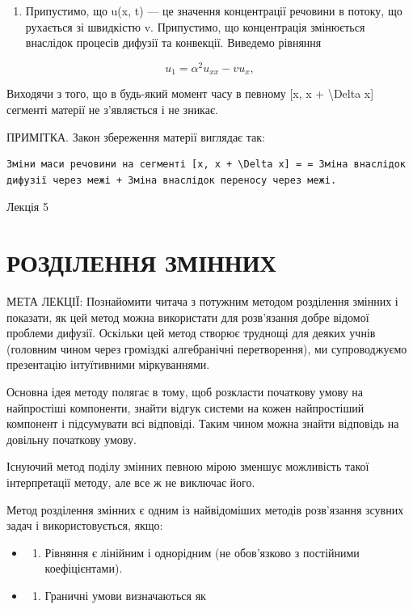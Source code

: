 \documentclass[
]{article}
\providecommand{\tightlist}{%
  \setlength{\itemsep}{0pt}\setlength{\parskip}{0pt}}
\begin{document}
\begin{enumerate}
\def\labelenumi{\arabic{enumi}.}
\setcounter{enumi}{3}
\tightlist
\item
  Припустимо, що u(x, t) --- це значення концентрації речовини в потоку,
  що рухається зі швидкістю v. Припустимо, що концентрація змінюється
  внаслідок процесів дифузії та конвекції. Виведемо рівняння
\end{enumerate}

\[
u_1 = \alpha^2 u_{xx} - v u_x,
\]

Виходячи з того, що в будь-який момент часу в певному {[}x, x +
\textbackslash Delta x{]} сегменті матерії не з'являється і не зникає.

ПРИМІТКА. Закон збереження матерії виглядає так:

\begin{verbatim}
Зміни маси речовини на сегменті [x, x + \Delta x] = = Зміна внаслідок дифузії через межі + Зміна внаслідок переносу через межі.
\end{verbatim}

Лекція 5

\section{РОЗДІЛЕННЯ
ЗМІННИХ}\label{ux440ux43eux437ux434ux456ux43bux435ux43dux43dux44f-ux437ux43cux456ux43dux43dux438ux445}

МЕТА ЛЕКЦІЇ: Познайомити читача з потужним методом розділення змінних і
показати, як цей метод можна використати для розв'язання добре відомої
проблеми дифузії. Оскільки цей метод створює труднощі для деяких учнів
(головним чином через громіздкі алгебранічні перетворення), ми
супроводжуємо презентацію інтуїтивними міркуваннями.

Основна ідея методу полягає в тому, щоб розкласти початкову умову на
найпростіші компоненти, знайти відгук системи на кожен найпростіший
компонент і підсумувати всі відповіді. Таким чином можна знайти
відповідь на довільну початкову умову.

Існуючий метод поділу змінних певною мірою зменшує можливість такої
інтерпретації методу, але все ж не виключає його.

Метод розділення змінних є одним із найвідоміших методів розв'язання
зсувних задач і використовується, якщо:

\begin{itemize}
\tightlist
\item
  \begin{enumerate}
  \def\labelenumi{\arabic{enumi}.}
  \tightlist
  \item
    Рівняння є лінійним і однорідним (не обов'язково з постійними
    коефіцієнтами).
  \end{enumerate}
\item
  \begin{enumerate}
  \def\labelenumi{\arabic{enumi}.}
  \setcounter{enumi}{1}
  \tightlist
  \item
    Граничні умови визначаються як
  \end{enumerate}
\end{itemize}
\end{document}
